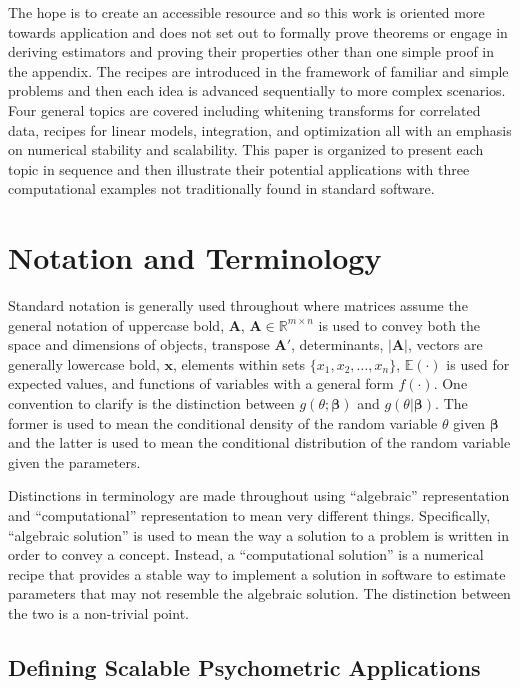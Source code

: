 \documentclass[12pt]{article}
\begin{document}
The hope is to create an accessible resource and so this work is oriented more towards application and does not set out to formally prove theorems or engage in deriving estimators and proving their properties other than one simple proof in the appendix. The recipes are introduced in the framework of familiar and simple problems and then each idea is advanced sequentially to more complex scenarios. Four general topics are covered including whitening transforms for correlated data, recipes for linear models, integration, and optimization all with an emphasis on numerical stability and scalability. This paper is organized to present each topic in sequence and then illustrate their potential applications with three computational examples not traditionally found in standard software. 

\section*{Notation and Terminology} 

Standard notation is generally used throughout where matrices assume the general notation of uppercase bold, $\bm{A}$, $\bm{A} \in \mathbb{R}^{m \times n}$ is used to convey both the space and dimensions of objects, transpose $\bm{A}'$, determinants, $|\bm{A}|$, vectors are generally lowercase bold, $\bm{x}$, elements within sets $\{x_1, x_2, \ldots, x_n\}$, $\mathbb{E}(\cdot)$ is used for expected values, and functions of variables with a general form $f(\cdot)$. One convention to clarify is the distinction between $g(\theta;\bm{\beta})$ and $g(\theta|\bm{\beta})$. The former is used to mean the conditional density of the random variable $\theta$ given $\bm{\beta}$ and the latter is used to mean the conditional distribution of the random variable given the parameters. 

Distinctions in terminology are made throughout using ``algebraic'' representation and ``computational'' representation to mean very different things. Specifically, ``algebraic solution'' is used to mean the way a solution to a problem is written in order to convey a concept. Instead, a ``computational solution'' is a numerical recipe that provides a stable way to implement a solution in software to estimate parameters that may not resemble the algebraic solution. The distinction between the two is a non-trivial point.                           

\subsection*{Defining Scalable Psychometric Applications}
\end{document}
